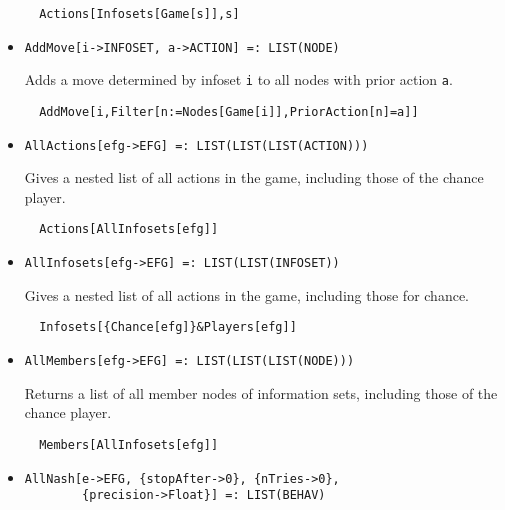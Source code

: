 \begin{itemize}
\begin{verbatim}
  Actions[Infosets[Game[s]],s]
\end{verbatim} 
\ed

\item{}
\protect \large \begin{verbatim}
AddMove[i->INFOSET, a->ACTION] =: LIST(NODE) 
\end{verbatim}\normalsize

\bd 
Adds a move determined by infoset \verb+i+ to all nodes with prior
action \verb+a+.  
\begin{verbatim}
  AddMove[i,Filter[n:=Nodes[Game[i]],PriorAction[n]=a]]
\end{verbatim} 
\ed

\item{}
\protect \large \begin{verbatim}
AllActions[efg->EFG] =: LIST(LIST(LIST(ACTION))) 
\end{verbatim}\normalsize

\bd 
Gives a nested list of all actions in the game, including those of
the chance player.  
\begin{verbatim}
  Actions[AllInfosets[efg]]
\end{verbatim} 
\ed

\item{}
\protect \large \begin{verbatim}
AllInfosets[efg->EFG] =: LIST(LIST(INFOSET)) 
\end{verbatim}\normalsize

\bd 
Gives a nested list of all actions in the game, including those for
chance. 
\begin{verbatim}
  Infosets[{Chance[efg]}&Players[efg]]
\end{verbatim} 
\ed

\item{}
\protect \large \begin{verbatim}
AllMembers[efg->EFG] =: LIST(LIST(LIST(NODE))) 
\end{verbatim}\normalsize

\bd 
Returns a list of all member nodes of information sets, including
those of the chance player.
\begin{verbatim}
  Members[AllInfosets[efg]]
\end{verbatim} 
\ed

\item{}
\protect \large \begin{verbatim}
AllNash[e->EFG, {stopAfter->0}, {nTries->0}, 
        {precision->Float}] =: LIST(BEHAV) 
\end{verbatim}\normalsize


\end{itemize}
